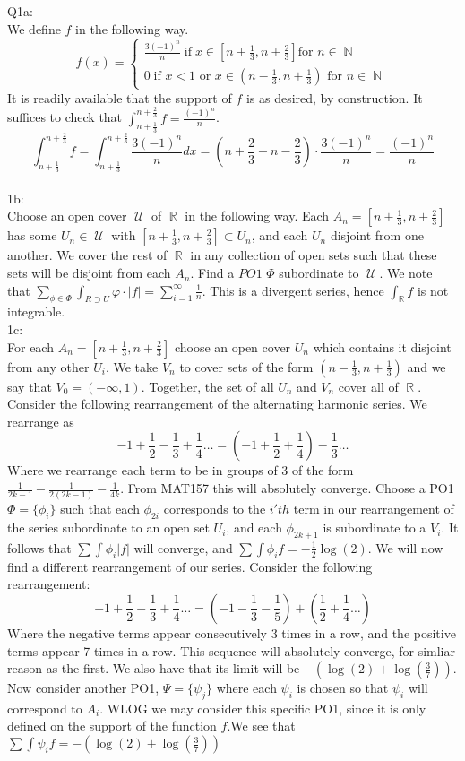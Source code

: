 \documentclass[letterpaper]{article}
\DeclareMathOperator{\U}{\mathcal{U}}
\DeclareMathOperator{\R}{\mathbb{R}}
\DeclareMathOperator{\N}{\mathbb{N}}
\begin{document}
\noindent Q1a: \\ We define $f$ in the following way. 
$$ f(x) =   \left\{
    \begin{array}{l}
     \frac{3(-1)^n}{n} \;\text{if}\; x \in [n+\frac{1}{3},n+\frac{2}{3}] \text{for }n\in \N\\
     0 \; \text{if } x<1 \text{ or } x\in (n-\frac{1}{3},n+\frac{1}{3}) \text{ for } n\in \N
    \end{array}
  \right.$$ 
It is readily available that the support of $f$ is as desired, by construction.  It suffices to check that $\int_{n+\frac{1}{3}}^{n+\frac{2}{3}} f = \frac{(-1)^n}{n}$. 
$$ \int_{n+\frac{1}{3}}^{n+\frac{2}{3}} f = \int_{n+\frac{1}{3}}^{n+\frac{2}{3}} \frac{3(-1)^n}{n} dx = (n+ \frac{2}{3} - n - \frac{2}{3}) \cdot \frac{3(-1)^n}{n} = \frac{(-1)^n}{n}$$
\\ 1b: \\
Choose an open cover $\U$ of $\R$ in the following way. Each $A_n = [n+\frac{1}{3},n+\frac{2}{3}]$ has some $U_n\in \U$ with $[n+\frac{1}{3},n+\frac{2}{3}]\subset U_n$, and each $U_n$ disjoint from one another. We cover the rest of $\R$ in any collection of open sets such that these sets will be disjoint from each $A_n$. Find a $PO1$ $\Phi$ subordinate to $\U$. We note that $\sum_{\phi\in \Phi} \int_{R \supset U} \varphi \cdot |f| = \sum_{i=1}^\infty \frac{1}{n}$. 
This is a divergent series, hence $\int_{\R} f$ is not integrable. 
\\ 1c: \\
For each $A_n = [n+\frac{1}{3},n+\frac{2}{3}]$ choose an open cover $U_n$ which contains it disjoint from any other $U_i$. We take $V_n$ to cover sets of the form $(n-\frac{1}{3},n+\frac{1}{3})$ and we say that $V_0 = (-\infty, 1)$. Together, the set of all $U_n$ and $V_n$ cover all of $\R$.  Consider the following rearrangement of the alternating harmonic series. 
We rearrange as $$-1 + \frac{1}{2}  - \frac{1}{3} + \frac{1}{4} \dots = (-1 + \frac{1}{2} + \frac{1}{4}) -\frac{1}{3} \dots$$
Where we rearrange each term to be in groups of 3 of the form $\frac{1}{2k-1}-\frac{1}{2(2k-1)}-\frac{1}{4k}$. From MAT157 this will absolutely converge. Choose a PO1 $\Phi = \{ \phi_i\}$ such that each $\phi_{2i}$ corresponds to the $i'th$ term in our rearrangement of the series subordinate to an open set $U_i$, and each $\phi_{2k+1}$ is subordinate to a $V_i$. 
It follows that $\sum\int \phi_i |f|$ will converge, and $\sum \int \phi_i f = - \frac{1}{2}\log (2)$. We will now find a different rearrangement of our series. Consider the following rearrangement: 
$$-1 + \frac{1}{2} - \frac{1}{3} + \frac{1}{4} \dots = (-1  - \frac{1}{3} - \frac{1}{5}) + (\frac{1}{2} + \frac{1}{4}\dots)$$ Where the negative terms appear consecutively 3 times in a row, and the positive terms appear 7 times in a row. This sequence will absolutely converge, for simliar reason as the first. We also have that its limit will be $-(\log(2) + \log(\frac{3}{7}))$. 
Now consider another PO1, $\Psi = \{\psi_j \}$ where each $\psi_i$ is chosen so that $\psi_i$ will correspond to $A_i$. WLOG we may consider this specific PO1, since it is only defined on the support of the function $f $.We see that $\sum \int \psi_i f = -(\log(2)+ \log(\frac{3}{7}))$
\end{document}
